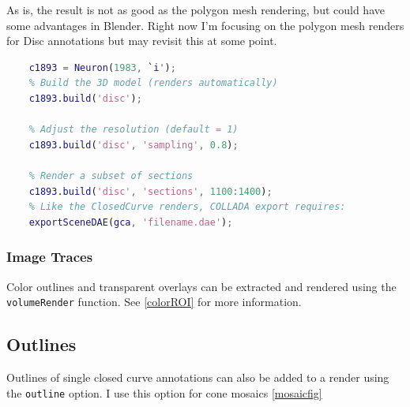 \documentclass[12pt]{exam}
\begin{document}
	As is, the result is not as good as the polygon mesh rendering, but could have some advantages in Blender. Right now I'm focusing on the polygon mesh renders for Disc annotations but may revisit this at some point.
	\begin{lstlisting}[language=matlab]
	% Load a rod bipolar cell
	c1893 = Neuron(1983, `i');
	% Build the 3D model (renders automatically)
	c1893.build('disc');
	
	% Adjust the resolution (default = 1)
	c1893.build('disc', 'sampling', 0.8);
	
	% Render a subset of sections
	c1893.build('disc', 'sections', 1100:1400);
	% Like the ClosedCurve renders, COLLADA export requires:
	exportSceneDAE(gca, 'filename.dae');\end{lstlisting}

	\subsubsection{Image Traces}
	Color outlines and transparent overlays can be extracted and rendered using the \texttt{volumeRender} function. See \ref{colorROI} for more information.
	\subsection{Outlines}

	Outlines of single closed curve annotations can also be added to a render using the \texttt{outline} option. I use this option for cone mosaics \ref{mosaicfig}
	
\end{document}
